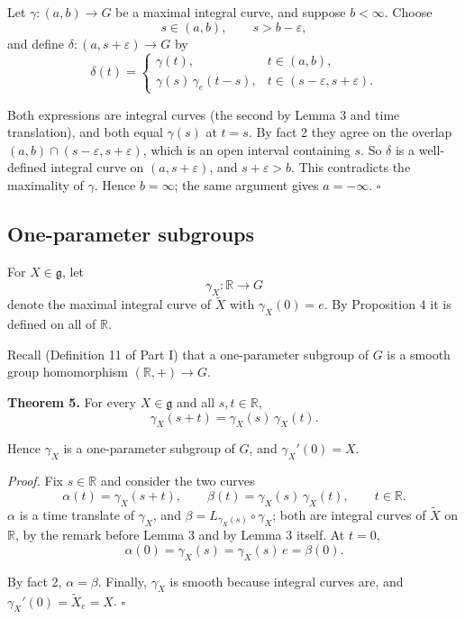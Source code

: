 \documentclass[11pt]{article}
\begin{document}
Let $\gamma : (a, b) \to G$ be a maximal integral curve, and suppose $b < \infty$. Choose
\[
s \in (a, b), \qquad s > b - \varepsilon,
\]
and define $\delta : (a, s + \varepsilon) \to G$ by
\[
\delta(t) =
\begin{cases}
\gamma(t), & t \in (a, b), \\
\gamma(s)\, \gamma_e(t - s), & t \in (s - \varepsilon, s + \varepsilon).
\end{cases}
\]

Both expressions are integral curves (the second by Lemma 3 and time translation), and both equal $\gamma(s)$ at $t = s$. By fact 2 they agree on the overlap $(a, b) \cap (s - \varepsilon, s + \varepsilon)$, which is an open interval containing $s$. So $\delta$ is a well-defined integral curve on $(a, s + \varepsilon)$, and $s + \varepsilon > b$. This contradicts the maximality of $\gamma$. Hence $b = \infty$; the same argument gives $a = -\infty$. $\square$

\subsection{One-parameter subgroups}

For $X \in \mathfrak{g}$, let
\[
\gamma_X : \mathbb{R} \to G
\]
denote the maximal integral curve of $\widetilde{X}$ with $\gamma_X(0) = e$. By Proposition 4 it is defined on all of $\mathbb{R}$.

Recall (Definition 11 of Part I) that a one-parameter subgroup of $G$ is a smooth group homomorphism $(\mathbb{R}, +) \to G$.

\textbf{Theorem 5.} For every $X \in \mathfrak{g}$ and all $s, t \in \mathbb{R}$,
\[
\boxed{\gamma_X(s + t) = \gamma_X(s)\, \gamma_X(t).}
\]

Hence $\gamma_X$ is a one-parameter subgroup of $G$, and $\gamma_X'(0) = X$.

\emph{Proof.} Fix $s \in \mathbb{R}$ and consider the two curves
\[
\alpha(t) = \gamma_X(s + t), \qquad \beta(t) = \gamma_X(s)\, \gamma_X(t), \qquad t \in \mathbb{R}.
\]
$\alpha$ is a time translate of $\gamma_X$, and $\beta = L_{\gamma_X(s)} \circ \gamma_X$; both are integral curves of $\widetilde{X}$ on $\mathbb{R}$, by the remark before Lemma 3 and by Lemma 3 itself. At $t = 0$,
\[
\alpha(0) = \gamma_X(s) = \gamma_X(s)\, e = \beta(0).
\]

By fact 2, $\alpha = \beta$. Finally, $\gamma_X$ is smooth because integral curves are, and $\gamma_X'(0) = \widetilde{X}_e = X$. $\square$
\end{document}
